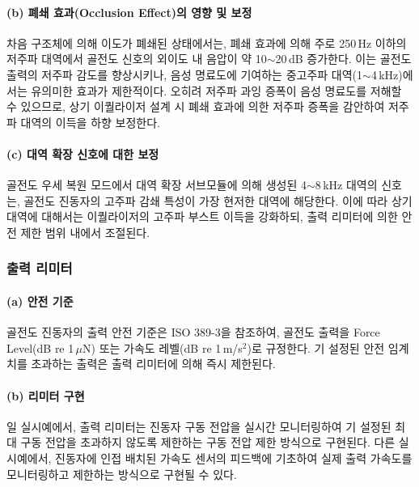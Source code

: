 \documentclass{article}
\begin{document}
\paragraph{(b) 폐쇄 효과(Occlusion Effect)의 영향 및 보정}

차음 구조체에 의해 이도가 폐쇄된 상태에서는, 폐쇄 효과에 의해 주로 250\,Hz 이하의 저주파 대역에서 골전도 신호의 외이도 내 음압이 약 10$\sim$20\,dB 증가한다. 이는 골전도 출력의 저주파 감도를 향상시키나, 음성 명료도에 기여하는 중고주파 대역(1$\sim$4\,kHz)에서는 유의미한 효과가 제한적이다. 오히려 저주파 과잉 증폭이 음성 명료도를 저해할 수 있으므로, 상기 이퀄라이저 설계 시 폐쇄 효과에 의한 저주파 증폭을 감안하여 저주파 대역의 이득을 하향 보정한다.

\paragraph{(c) 대역 확장 신호에 대한 보정}

골전도 우세 복원 모드에서 대역 확장 서브모듈에 의해 생성된 4$\sim$8\,kHz 대역의 신호는, 골전도 진동자의 고주파 감쇄 특성이 가장 현저한 대역에 해당한다. 이에 따라 상기 대역에 대해서는 이퀄라이저의 고주파 부스트 이득을 강화하되, 출력 리미터에 의한 안전 제한 범위 내에서 조절된다.

\subsubsection{출력 리미터}

\paragraph{(a) 안전 기준}

골전도 진동자의 출력 안전 기준은 ISO 389-3을 참조하여, 골전도 출력을 Force Level(dB re 1\,$\mu$N) 또는 가속도 레벨(dB re 1\,m/s$^2$)로 규정한다. 기 설정된 안전 임계치를 초과하는 출력은 출력 리미터에 의해 즉시 제한된다.

\paragraph{(b) 리미터 구현}

일 실시예에서, 출력 리미터는 진동자 구동 전압을 실시간 모니터링하여 기 설정된 최대 구동 전압을 초과하지 않도록 제한하는 구동 전압 제한 방식으로 구현된다. 다른 실시예에서, 진동자에 인접 배치된 가속도 센서의 피드백에 기초하여 실제 출력 가속도를 모니터링하고 제한하는 방식으로 구현될 수 있다.
\end{document}
